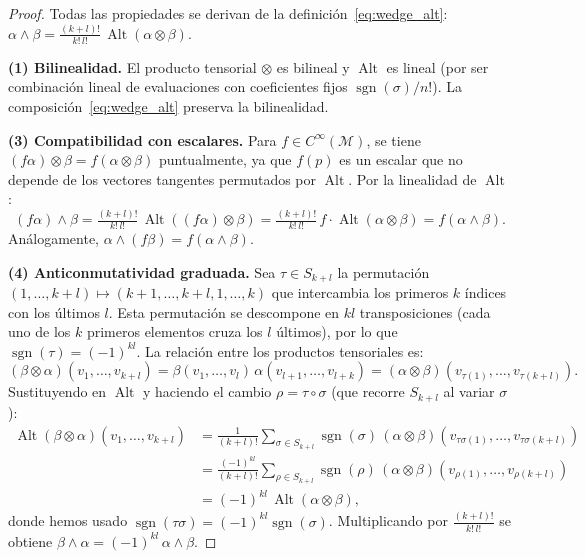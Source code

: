 \begin{proof}
Todas las propiedades se derivan de la definición~\eqref{eq:wedge_alt}: $\alpha \wedge \beta = \frac{(k+l)!}{k!\,l!}\, \operatorname{Alt}(\alpha \otimes \beta)$.

\textbf{(1) Bilinealidad.} El producto tensorial $\otimes$ es bilineal y $\operatorname{Alt}$ es lineal (por ser combinación lineal de evaluaciones con coeficientes fijos $\operatorname{sgn}(\sigma)/n!$). La composición~\eqref{eq:wedge_alt} preserva la bilinealidad.

\textbf{(3) Compatibilidad con escalares.} Para $f \in C^\infty(\mathcal{M})$, se tiene $(f\alpha) \otimes \beta = f(\alpha \otimes \beta)$ puntualmente, ya que $f(p)$ es un escalar que no depende de los vectores tangentes permutados por $\operatorname{Alt}$. Por la linealidad de $\operatorname{Alt}$:
\[
(f\alpha) \wedge \beta = \tfrac{(k+l)!}{k!\,l!}\,\operatorname{Alt}((f\alpha) \otimes \beta) = \tfrac{(k+l)!}{k!\,l!}\,f\cdot\operatorname{Alt}(\alpha \otimes \beta) = f(\alpha \wedge \beta).
\]
Análogamente, $\alpha \wedge (f\beta) = f(\alpha \wedge \beta)$.

\textbf{(4) Anticonmutatividad graduada.} Sea $\tau \in S_{k+l}$ la permutación $(1, \ldots, k+l) \mapsto (k{+}1, \ldots, k{+}l, 1, \ldots, k)$ que intercambia los primeros $k$ índices con los últimos $l$. Esta permutación se descompone en $kl$ transposiciones (cada uno de los $k$ primeros elementos cruza los $l$ últimos), por lo que $\operatorname{sgn}(\tau) = (-1)^{kl}$. La relación entre los productos tensoriales es:
\[
(\beta \otimes \alpha)(v_1, \ldots, v_{k+l}) = \beta(v_1, \ldots, v_l)\,\alpha(v_{l+1}, \ldots, v_{l+k}) = (\alpha \otimes \beta)(v_{\tau(1)}, \ldots, v_{\tau(k+l)}).
\]
Sustituyendo en $\operatorname{Alt}$ y haciendo el cambio $\rho = \tau \circ \sigma$ (que recorre $S_{k+l}$ al variar $\sigma$):
\begin{align*}
\operatorname{Alt}(\beta \otimes \alpha)(v_1, \ldots, v_{k+l})
  &= \frac{1}{(k{+}l)!}\sum_{\sigma \in S_{k+l}} \operatorname{sgn}(\sigma)\,(\alpha \otimes \beta)(v_{\tau\sigma(1)}, \ldots, v_{\tau\sigma(k+l)}) \\
  &= \frac{(-1)^{kl}}{(k{+}l)!}\sum_{\rho \in S_{k+l}} \operatorname{sgn}(\rho)\,(\alpha \otimes \beta)(v_{\rho(1)}, \ldots, v_{\rho(k+l)}) \\
  &= (-1)^{kl}\,\operatorname{Alt}(\alpha \otimes \beta),
\end{align*}
donde hemos usado $\operatorname{sgn}(\tau\sigma) = (-1)^{kl}\operatorname{sgn}(\sigma)$. Multiplicando por $\frac{(k+l)!}{k!\,l!}$ se obtiene $\beta \wedge \alpha = (-1)^{kl}\,\alpha \wedge \beta$.


\end{proof}
